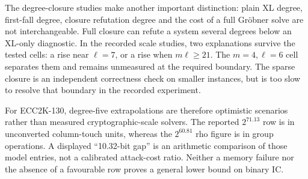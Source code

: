 The degree-closure studies make another important distinction: plain
XL degree, first-fall degree, closure refutation degree and the cost of a
full Gröbner solve are not interchangeable. Full closure can refute a
system several degrees below an XL-only diagnostic. In the recorded
scale studies, two explanations survive the tested cells: a rise near
$\ell=7$, or a rise when $m\ell\ge21$. The $m=4,\ell=6$ cell separates
them and remains unmeasured at the required boundary. The sparse closure
is an independent correctness check on smaller instances, but is too
slow to resolve that boundary in the recorded experiment.

For ECC2K-130, degree-five extrapolations are therefore optimistic
scenarios rather than measured cryptographic-scale solvers. The
reported $2^{71.13}$ row is in unconverted column-touch units, whereas
the $2^{60.81}$ rho figure is in group operations. A displayed
``10.32-bit gap'' is an arithmetic comparison of those model entries,
not a calibrated attack-cost ratio. Neither a memory failure nor the
absence of a favourable row proves a general lower bound on binary IC.
